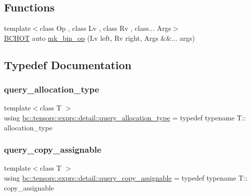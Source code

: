 \subsection*{Functions}
\begin{DoxyCompactItemize}
\item 
{\footnotesize template$<$class Op , class Lv , class Rv , class... Args$>$ }\\\hyperlink{common_8h_ac085f07cc309e3aac24aa3fc0a40f6d2}{B\+C\+H\+OT} auto \hyperlink{namespacebc_1_1tensors_1_1exprs_1_1detail_a710acb08a5ec6aaac546f59ac5368231}{mk\+\_\+bin\+\_\+op} (Lv left, Rv right, Args \&\&... args)
\end{DoxyCompactItemize}


\subsection{Typedef Documentation}
\mbox{\label{namespacebc_1_1tensors_1_1exprs_1_1detail_aa48f3a00816d9b230e5f0ce720323f57}} 
\subsubsection{\texorpdfstring{query\+\_\+allocation\+\_\+type}{query\_allocation\_type}}
{\footnotesize\ttfamily template$<$class T $>$ \\
using \hyperlink{namespacebc_1_1tensors_1_1exprs_1_1detail_aa48f3a00816d9b230e5f0ce720323f57}{bc\+::tensors\+::exprs\+::detail\+::query\+\_\+allocation\+\_\+type} = typedef typename T\+:: allocation\+\_\+type}

\mbox{\label{namespacebc_1_1tensors_1_1exprs_1_1detail_a48ce13185316802e0ca8ad8cee7d5870}} 
\subsubsection{\texorpdfstring{query\+\_\+copy\+\_\+assignable}{query\_copy\_assignable}}
{\footnotesize\ttfamily template$<$class T $>$ \\
using \hyperlink{namespacebc_1_1tensors_1_1exprs_1_1detail_a48ce13185316802e0ca8ad8cee7d5870}{bc\+::tensors\+::exprs\+::detail\+::query\+\_\+copy\+\_\+assignable} = typedef typename T\+:: copy\+\_\+assignable}

